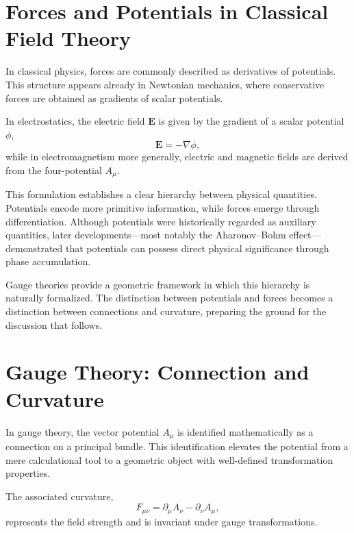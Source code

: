 \documentclass[12pt,letterpaper]{article}
\begin{document}
\section{Forces and Potentials in Classical Field Theory}

\justifying
In classical physics, forces are commonly described as derivatives of potentials. This structure appears already in Newtonian mechanics, where conservative forces are obtained as gradients of scalar potentials.

In electrostatics, the electric field $\mathbf{E}$ is given by the gradient of a scalar potential $\phi$,
\begin{equation}
\mathbf{E} = -\nabla \phi,
\end{equation}
while in electromagnetism more generally, electric and magnetic fields are derived from the four-potential $A_\mu$.

This formulation establishes a clear hierarchy between physical quantities. Potentials encode more primitive information, while forces emerge through differentiation. Although potentials were historically regarded as auxiliary quantities, later developments—most notably the Aharonov--Bohm effect—demonstrated that potentials can possess direct physical significance through phase accumulation.

Gauge theories provide a geometric framework in which this hierarchy is naturally formalized. The distinction between potentials and forces becomes a distinction between connections and curvature, preparing the ground for the discussion that follows.


\section{Gauge Theory: Connection and Curvature}

\justifying
In gauge theory, the vector potential $A_\mu$ is identified mathematically as a connection on a principal bundle. This identification elevates the potential from a mere calculational tool to a geometric object with well-defined transformation properties.

The associated curvature,
\begin{equation}
F_{\mu\nu} = \partial_\mu A_\nu - \partial_\nu A_\mu,
\end{equation}
represents the field strength and is invariant under gauge transformations.
\end{document}
